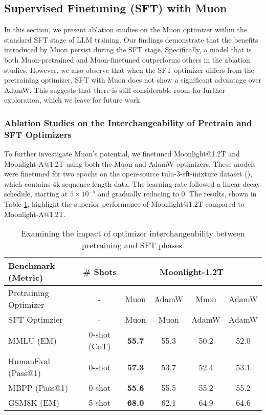 


\subsection{Supervised Finetuning (SFT) with Muon}


In this section, we present ablation studies on the Muon optimizer within the standard SFT stage of LLM training. Our findings demonstrate that the benefits introduced by Muon persist during the SFT stage. Specifically, a model that is both Muon-pretrained and Muon-finetuned outperforms others in the ablation studies. However, we also observe that when the SFT optimizer differs from the pretraining optimizer, SFT with Muon does not show a significant advantage over AdamW. This suggests that there is still considerable room for further exploration, which we leave for future work.

\subsubsection{Ablation Studies on the Interchangeability of Pretrain and SFT Optimizers}

To further investigate Muon’s potential, we finetuned Moonlight@1.2T and Moonlight-A@1.2T using both the Muon and AdamW optimizers. These models were finetuned for two epochs on the open-source tulu-3-sft-mixture dataset (\cite{lambert2024tulu3}), which contains 4k sequence length data. The learning rate followed a linear decay schedule, starting at $5 \times 10^{-5}$ and gradually reducing to $0$. The results, shown in Table \ref{tab:optim-interchangeability}, highlight the superior performance of Moonlight@1.2T compared to Moonlight-A@1.2T.


\begin{table}[ht]
\small
\centering
\caption{Examining the impact of optimizer interchangeability between pretraining and SFT phases.}
\label{tab:optim-interchangeability}
\begin{tabular}{l c|c|c|c|c}
\toprule
\textbf{Benchmark (Metric)} & \textbf{\# Shots} & \multicolumn{4}{|c}{\textbf{Moonlight-1.2T}} \\
\midrule
Pretraining Optimizer & - & Muon & AdamW & Muon & AdamW \\
SFT Optimzier & - & Muon & Muon & AdamW & AdamW \\
\midrule
MMLU (EM) & 0-shot (CoT) & \textbf{55.7} & 55.3 & 50.2 & 52.0 \\
HumanEval (Pass@1) & 0-shot & \textbf{57.3} & 53.7 & 52.4 & 53.1 \\
MBPP (Pass@1) & 0-shot & \textbf{55.6} & 55.5 & 55.2 & 55.2 \\
GSM8K (EM) & 5-shot & \textbf{68.0} & 62.1 & 64.9 & 64.6 \\
\bottomrule
\end{tabular}

\end{table}

